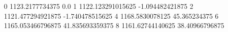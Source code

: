 0 1123.2177734375 0.0
1 1122.123291015625 -1.094482421875
2 1121.477294921875 -1.740478515625
4 1168.5830078125 45.365234375
6 1165.053466796875 41.835693359375
8 1161.62744140625 38.40966796875
